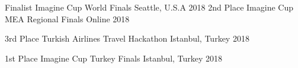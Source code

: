 
\vspace*{-1.5mm}

\vspace*{-1.5mm}

\begin{cvhonors}
  \cvhonor
    {Finalist}%
    {Imagine Cup World Finals}%
    {Seattle, U.S.A}%
    {2018}%
  \cvhonor
    {2nd Place}
    {Imagine Cup MEA Regional Finals} %
    {Online}
    {2018}
\end{cvhonors}


\vspace*{-1.5mm}

\begin{cvhonors}

  \cvhonor
    {3rd Place}
    {Turkish Airlines Travel Hackathon}
    {Istanbul, Turkey}
    {2018}

   \cvhonor
    {1st Place}
    {Imagine Cup Turkey Finals}
    {Istanbul, Turkey}
    {2018}

\end{cvhonors}
